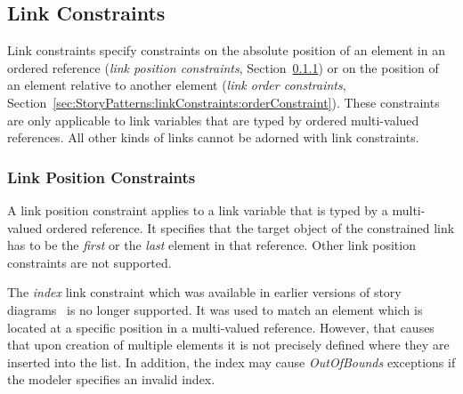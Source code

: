 {
\subsection{Link Constraints}
\label{sec:StoryPatterns:linkConstraints}

Link constraints specify constraints on the absolute position of an element in an ordered reference (\emph{link position constraints}, Section~\ref{sec:StoryPatterns:linkConstraints:posConstraint}) or on the position of an element relative to another element (\emph{link order constraints}, Section~\ref{sec:StoryPatterns:linkConstraints:orderConstraint}). These constraints are only applicable to link variables that are typed by ordered multi-valued references. All other kinds of links cannot be adorned with link constraints.



\subsubsection{Link Position Constraints}
\label{sec:StoryPatterns:linkConstraints:posConstraint}

A link position constraint applies to a link variable that is typed by a multi-valued ordered reference. It specifies that the target object of the constrained link has to be the \emph{first} or the \emph{last} element in that reference. Other link position constraints are not supported. 

The \emph{index} link constraint which was available in earlier versions of story diagrams~\cite{WW01_ag} is no longer supported. 
It was used to match an element which is located at a specific position in a multi-valued reference. 
However, that causes that upon creation of multiple elements it is not precisely defined where they are inserted into the list. 
In addition, the index may cause \emph{OutOfBounds} exceptions if the modeler specifies an invalid index.

}
